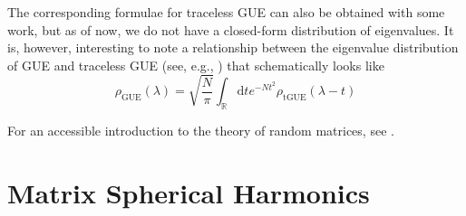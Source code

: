 The corresponding formulae for traceless GUE can also be obtained with some work, but as of now, we do not have a closed-form distribution of eigenvalues. It is, however, interesting to note a relationship between the eigenvalue distribution of GUE and traceless GUE (see, e.g., \cite{1999math......4042T}) that schematically looks like
\begin{equation}
  \rho_{\mathrm{GUE}}(\lambda) = \sqrt{\frac{N}{\pi}} \int_{\mathbb{R}} \text{d} t e^{-N t^2} \rho_{\mathrm{tGUE}}(\lambda - t)
\end{equation}

For an accessible introduction to the theory of random matrices, see \cite{Livan_2018}. 



\chapter{Matrix Spherical Harmonics}
\label{app:matrix-harmonics}

